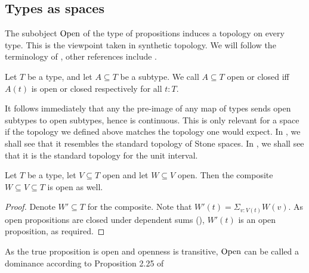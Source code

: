 \subsection{Types as spaces}
The subobject $\mathrm{Open}$ of the type of propositions induces a topology on every type. 
This is the viewpoint taken in synthetic topology. 
We will follow the terminology of \cite{SyntheticTopologyLesnik}, 
other references include \cite{SyntheticTopologyEscardo, TODOSortOutTaylorsReferences}.

\begin{definition}
  Let $T$ be a type, and let $A\subseteq T$ be a subtype. 
  We call $A\subseteq T$ open or closed iff $A(t)$ is open or closed respectively for all $t:T$.
\end{definition}

\begin{remark}
  It follows immediately that any the pre-image of any map of types sends 
  open subtypes to open subtypes, hence is continuous. 
  This is only relevant for a space if the topology we defined above matches the topology one would expect. 
  In , we shall see that it resembles the standard topology of Stone spaces.
  In , we shall see that it is the standard topology for the unit interval. 
\end{remark}

\begin{lemma}\label{OpenTransitive}
  Let $T$ be a type, let $V\subseteq T$ open and let $W\subseteq V$ open. 
  Then the composite $W\subseteq V\subseteq T$ is open as well. 
\end{lemma}
\begin{proof}
  Denote $W'\subseteq T$ for the composite. 
  Note that $W'(t) = \Sigma_{v:V(t)} W(v)$. 
  As open propositions are closed under dependent sums (), 
  $W'(t)$ is an open proposition, as required. 
\end{proof}

\begin{remark}\label{OpenDominance}
  As the true proposition is open and openness is transitive, 
  $\mathrm{Open}$ can be called a dominance according to Proposition 2.25 of \cite{SyntheticTopologyLesnik}
\end{remark}



